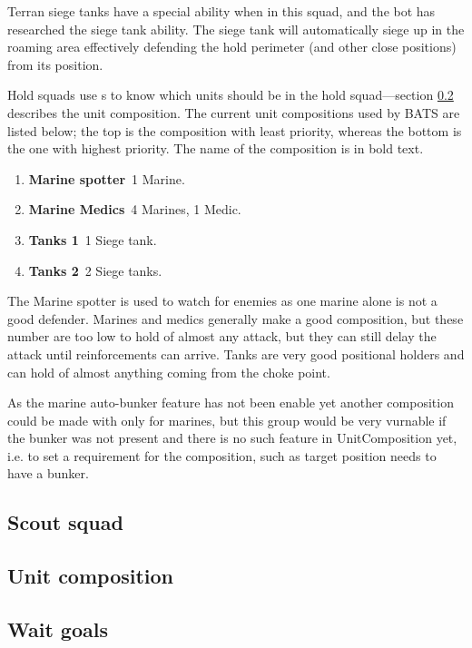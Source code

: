 Terran siege tanks have a special ability when in this squad, and the bot has researched the siege tank ability. The siege tank will automatically siege up in the roaming area effectively defending the hold perimeter (and other close positions) from its position.

Hold squads use s to know which units should be in the hold squad—section \ref{sec:unit_composition} describes the unit composition. The current unit compositions used by BATS are listed below; the top is the composition with least priority, whereas the bottom is the one with highest priority. The name of the composition is in bold text.

\begin{enumerate}
	\item \textbf{Marine spotter}~1 Marine.
	\item \textbf{Marine Medics}~4 Marines, 1 Medic.
	\item \textbf{Tanks 1}~1 Siege tank.
	\item \textbf{Tanks 2}~2 Siege tanks.
\end{enumerate}
The Marine spotter is used to watch for enemies as one marine alone is not a good defender. Marines and medics generally make a good composition, but these number are too low to hold of almost any attack, but they can still delay the attack until reinforcements can arrive. Tanks are very good positional holders and can hold of almost anything coming from the choke point. 

As the marine auto-bunker feature has not been enable yet another composition could be made with only for marines, but this group would be very vurnable if the bunker was not present and there is no such feature in UnitComposition yet, i.e. to set a requirement for the composition, such as target position needs to have a bunker.

\subsection{Scout squad}
\label{sec:scout_squad}

\subsection{Unit composition}
\label{sec:unit_composition}

\subsection{Wait goals}
\label{sec:wait_goals}
